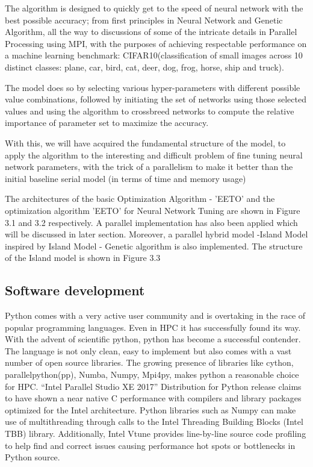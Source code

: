 The algorithm is designed to quickly get to the speed of neural network with the best possible accuracy; from first principles in Neural Network and Genetic Algorithm, all the way to discussions of some of the intricate details in Parallel Processing using MPI, with the purposes of achieving respectable performance on a machine learning benchmark: CIFAR10(classification of small images across 10 distinct classes: plane, car, bird, cat, deer, dog, frog, horse, ship and truck).


The model does so by selecting various hyper-parameters with different possible value combinations, followed by initiating the set of networks using those selected values and using the algorithm to crossbreed networks to compute the relative importance of parameter set to maximize the accuracy. 

With this, we will have acquired the fundamental structure of the model, to apply the algorithm to the interesting and difficult problem of fine tuning neural network parameters, with the trick of a parallelism to make it better than the initial baseline serial model (in terms of time and memory usage)

The architectures of the basic Optimization Algorithm - 'EETO' and the optimization algorithm 'EETO' for Neural Network Tuning are shown in Figure 3.1 and 3.2 respectively. A parallel implementation has also been applied which will be discussed in later section. Moreover, a parallel hybrid model -Island Model inspired by Island Model - Genetic algorithm is also implemented\cite{cantu1998survey}. The structure of the Island model is shown in Figure 3.3


\subsection{Software development}


Python comes with a very active user community and is overtaking in the race of popular programming languages. Even in HPC it has successfully found its way. With the advent of scientific python, python has become a successful contender\cite{insidehpc}. The language is not only clean, easy to implement but also comes with a vast number of open source libraries. The growing presence of libraries like cython, parallelpython(pp), Numba, Numpy, Mpi4py, makes python a reasonable choice for HPC. “Intel Parallel Studio XE 2017” Distribution for Python release claims to have shown a near native C performance with compilers and library packages optimized for the Intel architecture. Python libraries such as Numpy can make use of multithreading through calls to the Intel Threading Building Blocks (Intel TBB) library. Additionally, Intel Vtune provides line-by-line source code profiling to help find and correct issues causing performance hot spots or bottlenecks in Python source. 

